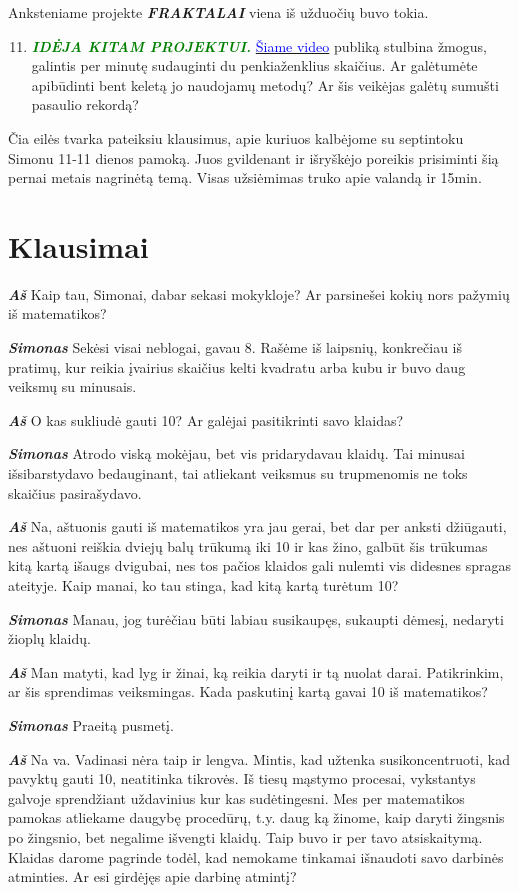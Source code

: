 \documentclass[a4paper]{article}
\newcommand{\say}[1]{\textbf{\textit{#1}}}
\newcommand{\goto}[2]{\href{\detokenize{#1}}{\textcolor{blue}{#2}}}
\begin{document}
Anksteniame projekte \textit{\textbf{FRAKTALAI}} viena iš užduočių buvo tokia.
\begin{enumerate}
\setcounter{enumi}{10}
\item \textcolor{green}{\say{IDĖJA KITAM PROJEKTUI.}} \goto{https://www.youtube.com/watch?v=M4vqr3_ROIk}{Šiame video} publiką stulbina žmogus, galintis per minutę sudauginti du penkiaženklius skaičius. Ar galėtumėte apibūdinti bent keletą jo naudojamų metodų? Ar šis veikėjas galėtų sumušti pasaulio rekordą?
\end{enumerate}
Čia eilės tvarka pateiksiu klausimus, apie kuriuos kalbėjome su septintoku Simonu 11-11 dienos pamoką. Juos gvildenant ir išryškėjo poreikis prisiminti šią pernai metais nagrinėtą temą. Visas užsiėmimas truko apie valandą ir 15min.
\section*{Klausimai}
\say{Aš} Kaip tau, Simonai, dabar sekasi mokykloje? Ar parsinešei kokių nors pažymių iš matematikos?

\say{Simonas} Sekėsi visai neblogai, gavau 8. Rašėme iš laipsnių, konkrečiau iš pratimų, kur reikia įvairius skaičius kelti kvadratu arba kubu ir buvo daug veiksmų su minusais.

\say{Aš} O kas sukliudė gauti 10? Ar galėjai pasitikrinti savo klaidas?

\say{Simonas} Atrodo viską mokėjau, bet vis pridarydavau klaidų. Tai minusai išsibarstydavo bedauginant, tai atliekant veiksmus su trupmenomis ne toks skaičius pasirašydavo.

\say{Aš} Na, aštuonis gauti iš matematikos yra jau gerai, bet dar per anksti džiūgauti, nes aštuoni reiškia dviejų balų trūkumą iki 10 ir kas žino, galbūt šis trūkumas kitą kartą išaugs dvigubai, nes tos pačios klaidos gali nulemti vis didesnes spragas ateityje. Kaip manai, ko tau stinga, kad kitą kartą turėtum 10?

\say{Simonas} Manau, jog turėčiau būti labiau susikaupęs, sukaupti dėmesį, nedaryti žioplų klaidų.

\say{Aš} Man matyti, kad lyg ir žinai, ką reikia daryti ir tą nuolat darai. Patikrinkim, ar šis sprendimas veiksmingas. Kada paskutinį kartą gavai 10 iš matematikos?

\say{Simonas} Praeitą pusmetį.

\say{Aš} Na va. Vadinasi nėra taip ir lengva. Mintis, kad užtenka susikoncentruoti, kad pavyktų gauti 10, neatitinka tikrovės. Iš tiesų mąstymo procesai, vykstantys galvoje sprendžiant uždavinius kur kas sudėtingesni. Mes per matematikos pamokas atliekame daugybę procedūrų, t.y. daug ką žinome, kaip daryti žingsnis po žingsnio, bet negalime išvengti klaidų. Taip buvo ir per tavo atsiskaitymą. Klaidas darome pagrinde todėl, kad nemokame tinkamai išnaudoti savo darbinės atminties. Ar esi girdėjęs apie darbinę atmintį?
\end{document}
